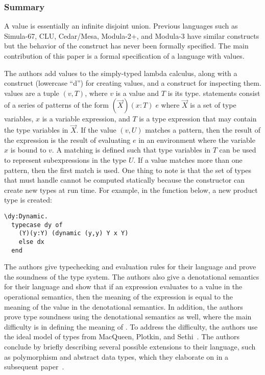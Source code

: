 \documentclass[12pt]{article}	%
\begin{document}
\subsubsection*{Summary}

A \Dynamic value is essentially an infinite disjoint union. Previous languages such as Simula-67, CLU, Cedar/Mesa, Modula-2+, and Modula-3 have similar constructs but the behavior of the construct has never been formally specified. The main contribution of this paper is a formal specification of a language with \Dynamic values. 

The authors add \Dynamic values to the simply-typed lambda calculus, along with a \dynamic construct (lowercase ``d'') for creating \Dynamic values, and a \typecase construct for inspecting them. \Dynamic values are a tuple $(v,T)$, where $v$ is a value and $T$ is its type. \typecase statements consist of a series of patterns of the form $(\vec{X})(x:T)\;e$ where $\vec{X}$ is a set of type variables, $x$ is a variable expression, and $T$ is a type expression that may contain the type variables in $\vec{X}$. If the \Dynamic value $(v,U)$ matches a pattern, then the result of the \typecase expression is the result of evaluating $e$ in an environment where the variable $x$ is bound to $v$. A matching is defined such that type variables in $T$ can be used to represent subexpressions in the type $U$. If a \Dynamic value matches more than one pattern, then the first match is used. One thing to note is that the set of types that \Dynamic must handle cannot be computed statically because the \dynamic constructor can create new types at run time. For example, in the function below, a new product type is created:

\begin{verbatim}
\dy:Dynamic.
  typecase dy of
    (Y)(y:Y) (dynamic (y,y) Y x Y)
    else dx
  end
\end{verbatim}

The authors give typechecking and evaluation rules for their language and prove the soundness of the type system. The authors also give a denotational semantics for their language and show that if an expression evaluates to a value in the operational semantics, then the meaning of the expression is equal to the meaning of the value in the denotational semantics. In addition, the authors prove type soundness using the denotational semantics as well, where the main difficulty is in defining the meaning of \Dynamic. To address the difficulty, the authors use the ideal model of types from MacQueen, Plotkin, and Sethi~\cite{MacQueen1986Ideal}. The authors conclude by briefly describing several possible extensions to their language, such as polymorphism and abstract data types, which they elaborate on in a subsequent paper~\cite{Abadi1995DynamicPolymorphic}.
\end{document}
